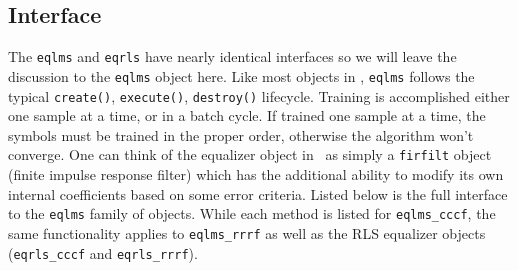 \subsection{Interface}
\label{module:equalization:interface}
The {\tt eqlms} and {\tt eqrls} have nearly identical interfaces so we will
leave the discussion to the {\tt eqlms} object here.
Like most objects in \liquid, {\tt eqlms} follows the typical
{\tt create()}, {\tt execute()}, {\tt destroy()} lifecycle.
Training is accomplished either one sample at a time, or in a batch cycle.
If trained one sample at a time, the symbols must be trained in the proper
order, otherwise the algorithm won't converge.
One can think of the equalizer object in \liquid\ as simply a
{\tt firfilt} object (finite impulse response filter)
which has the additional ability to modify its own internal coefficients
based on some error criteria.
%
Listed below is the full interface to the {\tt eqlms} family of
objects.
While each method is listed for {\tt eqlms\_cccf}, the same
functionality applies to {\tt eqlms\_rrrf}
as well as the RLS equalizer objects
({\tt eqrls\_cccf} and {\tt eqrls\_rrrf}).
%
